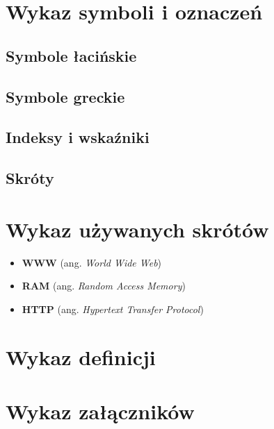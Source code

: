 \section*{Wykaz symboli i oznaczeń}
\subsection*{Symbole łacińskie}

\subsection*{Symbole greckie}

\subsection*{Indeksy i wskaźniki}

\subsection*{Skróty}


\printnomenclature

\newpage
\section*{Wykaz używanych skrótów}
\begin{itemize}
  \item \textbf{WWW} (ang. \textit{World Wide Web})
  \item \textbf{RAM} (ang. \textit{Random Access Memory})
  \item \textbf{HTTP} (ang. \textit{Hypertext Transfer Protocol})
\end{itemize}

\newpage
\section*{Wykaz definicji}

\newpage
\section*{Wykaz załączników}
